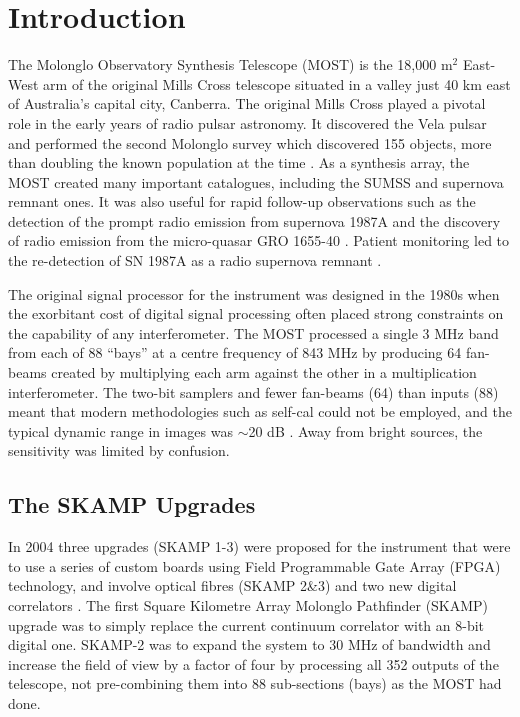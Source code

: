 \section{Introduction} 
The Molonglo Observatory Synthesis Telescope (MOST) is the 18,000 m$^2$ East-West arm of the original Mills Cross telescope situated in a valley just 40 km east of Australia's capital city, Canberra. The original Mills Cross played a pivotal role in the early years of radio pulsar astronomy. It discovered the Vela pulsar \citep{LARGE_1968} and performed the second Molonglo survey which discovered 155 objects, more than doubling the known population at the time \citep{Manchester_1978}. As a synthesis array, the MOST created many important catalogues, including the SUMSS \citep{Bock_1999,Mauch_2003} and supernova remnant \citep{Whiteoak_1996} ones. It was also useful for rapid follow-up observations such as the detection of the prompt radio emission from supernova 1987A \citep{Turtle_1987} and the discovery of radio emission from the micro-quasar GRO 1655-40 \citep{Tingay_1995}. Patient monitoring led to the re-detection of SN 1987A as a radio supernova remnant \citep{Staveley_Smith_1992}.

The original signal processor \citep{Robertson_1991} for the instrument was designed in the 1980s when the exorbitant cost of digital signal processing often placed strong constraints on the capability of any interferometer. The MOST processed a single 3 MHz band from each of 88 ``bays'' at a centre frequency of 843 MHz by producing 64 fan-beams created by multiplying each arm against the other in a multiplication interferometer. The two-bit samplers and fewer fan-beams (64) than inputs (88) meant that modern methodologies such as self-cal could not be employed, and the typical dynamic range in images was $\sim$20 dB \citep{Robertson_1991}. Away from bright sources, the sensitivity was limited by confusion.

\subsection{The SKAMP Upgrades}
In 2004 three upgrades (SKAMP 1-3) were proposed for the instrument that were to use a series of custom boards using Field Programmable Gate Array (FPGA) technology, and involve optical fibres (SKAMP 2\&3) and two new digital correlators \citep{Adams_2004}. The first Square Kilometre Array Molonglo Pathfinder (SKAMP) upgrade was to simply replace the current continuum correlator with an 8-bit digital one. SKAMP-2 was to expand the system to 30 MHz of bandwidth and increase the field of view by a factor of four by processing all 352 outputs of the telescope, not pre-combining them into 88 sub-sections (bays) as the MOST had done.


